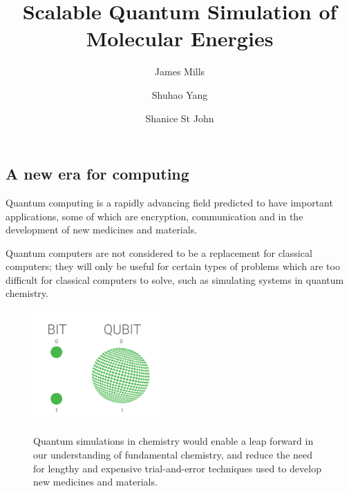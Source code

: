 \documentclass[14pt,landscape,color=UCLdarkred,margin=3cm]{uclposter}
\title{Scalable Quantum Simulation of Molecular Energies}
\author{James Mills}
\author{Shuhao Yang}
\author{Shanice St John}
\affil[1]{MSc Quantum Technologies, UCL}
\begin{document}
\large

\maketitle

\begin{multicols}{3}

\section*{A new era for computing}


Quantum computing is a rapidly advancing field predicted to have important applications, some of which are encryption, communication and in the development of new medicines and materials. 

Quantum computers are not considered to be a replacement for classical computers; they will only be useful for certain types of problems which are too difficult for classical computers to solve, such as simulating systems in quantum chemistry.
\\
\begin{figure}[H]
  \begin{center}
\setlength{\fboxsep}{0.5em}
  \begin{minipage}[c]{12em}
  \begin{center}
  \includegraphics[width=13em]{QUBIT.png}
  \end{center}
    
  \end{minipage}
  \qquad
  \begin{minipage}[c]{26em}
  \large

Quantum simulations in chemistry would enable a leap forward in our understanding of fundamental chemistry, and reduce the need for lengthy and expensive trial-and-error techniques used to develop new medicines and materials.


\end{minipage}
\end{center}
\end{figure}
\end{multicols}
\end{document}
